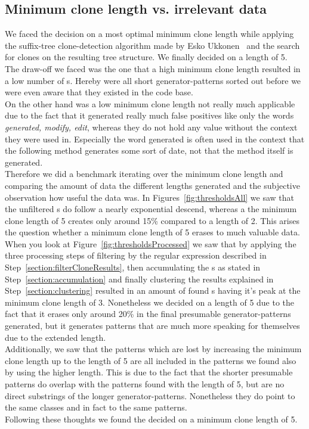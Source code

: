 \subsection{Minimum clone length vs. irrelevant data}
We faced the decision on a most optimal minimum clone length while applying the suffix-tree clone-detection algorithm made by Esko Ukkonen~\cite{Ukkonen1995} and the search for clones on the resulting tree structure. We finally decided on a length of 5. \\
The draw-off we faced was the one that a high minimum clone length resulted in a low number of s. Hereby were all short generator-patterns sorted out before we were even aware that they existed in the code base.\\
On the other hand was a low minimum clone length not really much applicable due to the fact that it generated really much false positives like only the words \textit{generated, modify, edit}, whereas they do not hold any value without the context they were used in. Especially the word generated is often used in the context that the following method generates some sort of date, not that the method itself is generated.\\
Therefore we did a benchmark iterating over the minimum clone length and comparing the amount of data the different lengths generated and the subjective observation how useful the data was. In Figures~\ref{fig:thresholdsAll} we saw that the unfiltered s do follow a nearly exponential descend, whereas a the minimum clone length of 5 creates only around 15\% compared to a length of 2. This arises the question whether a minimum clone length of 5 erases to much valuable data.\\
When you look at Figure~\ref{fig:thresholdsProcessed} we saw that by applying the three processing steps of filtering by the regular expression described in Step~\ref{section:filterCloneResults}, then accumulating the s as stated in Step~\ref{section:accumulation} and finally clustering the results explained in Step~\ref{section:clustering} resulted in an amount of found s having it's peak at the minimum clone length of 3. Nonetheless we decided on a length of 5 due to the fact that it erases only around 20\% in the final presumable generator-patterns generated, but it generates patterns that are much more speaking for themselves due to the extended length.\\
Additionally, we saw that the patterns which are lost by increasing the minimum clone length up to the length of 5 are all included in the patterns we found also by using the higher length. This is due to the fact that the shorter presumable patterns do overlap with the patterns found with the length of 5, but are no direct substrings of the longer generator-patterns. Nonetheless they do point to the same classes and in fact to the same patterns.\\
Following these thoughts we found the decided on a minimum clone length of 5.

